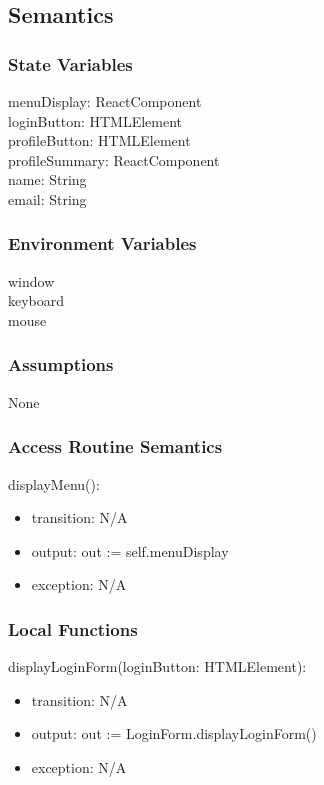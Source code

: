 \documentclass[12pt, titlepage]{article}
\begin{document}
\subsection{Semantics}

\subsubsection{State Variables}

menuDisplay: ReactComponent \\
loginButton: HTMLElement \\
profileButton: HTMLElement \\
profileSummary: ReactComponent \\
name: String \\
email: String

\subsubsection{Environment Variables}

window \\
keyboard \\
mouse

\subsubsection{Assumptions}

None

\subsubsection{Access Routine Semantics}

\noindent displayMenu():
\begin{itemize}
\item transition: N/A
\item output: out := self.menuDisplay 
\item exception: N/A
\end{itemize}

\subsubsection{Local Functions}

\noindent displayLoginForm(loginButton: HTMLElement):
\begin{itemize}
\item transition: N/A
\item output: out := LoginForm.displayLoginForm()
\item exception: N/A
\end{itemize}
\end{document}
